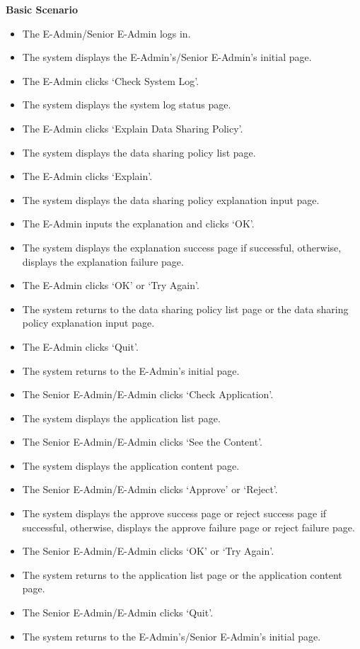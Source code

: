 \textbf{Basic Scenario}
\begin{itemize}
    \item The E-Admin/Senior E-Admin logs in.
    \item The system displays the E-Admin’s/Senior E-Admin’s initial page.
    \item The E-Admin clicks ‘Check System Log’.
    \item The system displays the system log status page.
    \item The E-Admin clicks ‘Explain Data Sharing Policy’.
    \item The system displays the data sharing policy list page.
    \item The E-Admin clicks ‘Explain’.
    \item The system displays the data sharing policy explanation input page.
    \item The E-Admin inputs the explanation and clicks ‘OK’.
    \item The system displays the explanation success page if successful, otherwise, displays the explanation failure page.
    \item The E-Admin clicks ‘OK’ or ‘Try Again’.
    \item The system returns to the data sharing policy list page or the data sharing policy explanation input page.
    \item The E-Admin clicks ‘Quit’.
    \item The system returns to the E-Admin’s initial page.
    \item The Senior E-Admin/E-Admin clicks ‘Check Application’.
    \item The system displays the application list page.
    \item The Senior E-Admin/E-Admin clicks ‘See the Content’.
    \item The system displays the application content page.
    \item The Senior E-Admin/E-Admin clicks ‘Approve’ or ‘Reject’.
    \item The system displays the approve success page or reject success page if successful, otherwise, displays the approve failure page or reject failure page.
    \item The Senior E-Admin/E-Admin clicks ‘OK’ or ‘Try Again’.
    \item The system returns to the application list page or the application content page.
    \item The Senior E-Admin/E-Admin clicks ‘Quit’.
    \item The system returns to the E-Admin’s/Senior E-Admin’s initial page.
\end{itemize}

